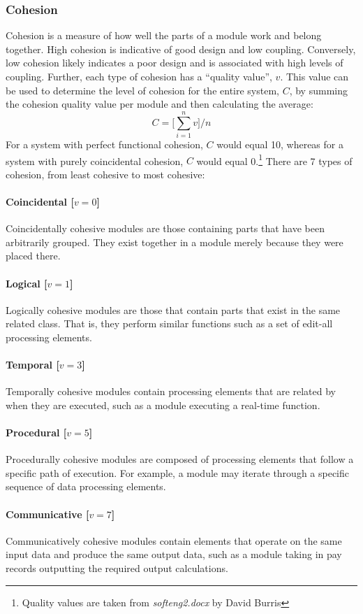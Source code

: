 \documentclass{article}
\begin{document}
		\subsubsection{Cohesion}
			Cohesion is a measure of how well the parts of a module work and belong together. High cohesion is indicative of good design and low coupling. Conversely, low cohesion likely indicates a poor design and is associated with high levels of coupling. Further, each type of cohesion has a ``quality value'', $v$. This value can be used to determine the level of cohesion for the entire system, $C$, by summing the cohesion quality value per module and then calculating the average:
			$$C = \Bigg[\sum_{i=1}^{n}v\Bigg] /n$$ 
			For a system with perfect functional cohesion, $C$ would equal 10, whereas for a system with purely coincidental cohesion, $C$ would equal 0.\footnote{Quality values are taken from \emph{softeng2.docx} by David Burris} There are 7 types of cohesion, from least cohesive to most cohesive:
			\paragraph{Coincidental [$v=0$]} Coincidentally cohesive modules are those containing parts that have been arbitrarily grouped. They exist together in a module merely because they were placed there. 
			\paragraph{Logical [$v=1$]} Logically cohesive modules are those that contain parts that exist in the same related class. That is, they perform similar functions such as a set of edit-all processing elements. 
			\paragraph{Temporal [$v=3$]} Temporally cohesive modules contain processing elements that are related by when they are executed, such as a module executing a real-time function. 
			\paragraph{Procedural [$v=5$]} Procedurally cohesive modules are composed of processing elements that follow a specific path of execution. For example, a module may iterate through a specific sequence of data processing elements. 
			\paragraph{Communicative [$v=7$]} Communicatively cohesive modules contain elements that operate on the same input data and produce the same output data, such as a module taking in pay records outputting the required output calculations. 
\end{document}
